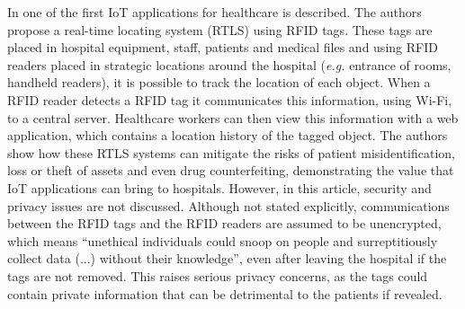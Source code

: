 


%

In \cite{Fuhrer2006} one of the first \acs{IoT} applications for healthcare is described. The authors propose a real-time locating system (RTLS) using \acs{RFID} tags. These tags are placed in hospital equipment, staff, patients and medical files and using \acs{RFID} readers placed in strategic locations around the hospital (\textit{e.g.} entrance of rooms, handheld readers), it is possible to track the location of each object. When a \acs{RFID} reader detects a \acs{RFID} tag it communicates this information, using Wi-Fi, to a central server. Healthcare workers can then view this information with a web application, which contains a location history of the tagged object. The authors show how these RTLS systems can mitigate the risks of patient misidentification, loss or theft of assets and even drug counterfeiting, demonstrating the value that \acs{IoT} applications can bring to hospitals. However, in this article, security and privacy issues are not discussed. Although not stated explicitly, communications between the RFID tags and the RFID readers are assumed to be unencrypted, which means ``unethical individuals could snoop on people and surreptitiously collect data (...) without their knowledge'', even after leaving the hospital if the tags are not removed. This raises serious privacy concerns, as the tags could contain private information that can be detrimental to the patients if revealed.

